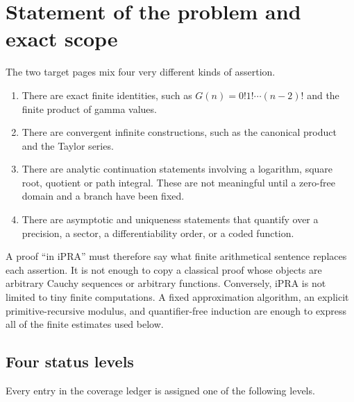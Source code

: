 \section{Statement of the problem and exact scope}

The two target pages mix four very different kinds of assertion.

\begin{enumerate}
\item There are exact finite identities, such as
\(G(n)=0!1!\cdots(n-2)!\) and the finite product of gamma values.
\item There are convergent infinite constructions, such as the canonical
product and the Taylor series.
\item There are analytic continuation statements involving a logarithm,
square root, quotient or path integral.  These are not meaningful until a
zero-free domain and a branch have been fixed.
\item There are asymptotic and uniqueness statements that quantify over a
precision, a sector, a differentiability order, or a coded function.
\end{enumerate}

A proof ``in iPRA'' must therefore say what finite arithmetical sentence replaces
each assertion.  It is not enough to copy a classical proof whose objects are
arbitrary Cauchy sequences or arbitrary functions.  Conversely, iPRA is not
limited to tiny finite computations.  A fixed approximation algorithm, an
explicit primitive-recursive modulus, and quantifier-free induction are enough
to express all of the finite estimates used below.

\subsection{Four status levels}\label{sec:scope-status}

Every entry in the coverage ledger is assigned one of the following levels.

